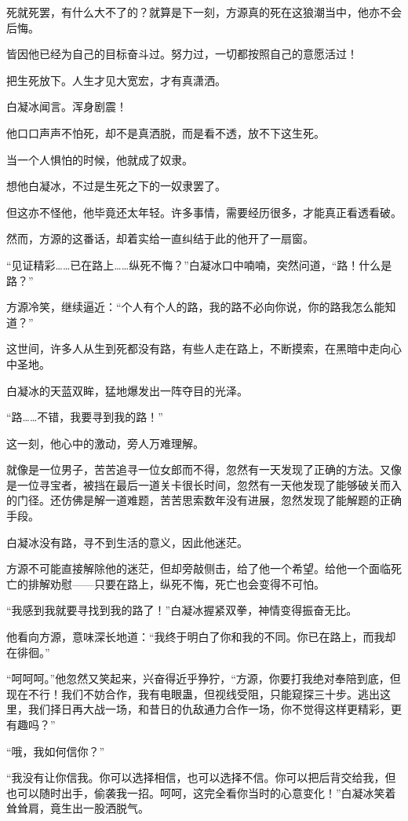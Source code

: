 \begin{this_body}
死就死罢，有什么大不了的？就算是下一刻，方源真的死在这狼潮当中，他亦不会后悔。

皆因他已经为自己的目标奋斗过。努力过，一切都按照自己的意愿活过！

把生死放下。人生才见大宽宏，才有真潇洒。

白凝冰闻言。浑身剧震！

他口口声声不怕死，却不是真洒脱，而是看不透，放不下这生死。

当一个人惧怕的时候，他就成了奴隶。

想他白凝冰，不过是生死之下的一奴隶罢了。

但这亦不怪他，他毕竟还太年轻。许多事情，需要经历很多，才能真正看透看破。

然而，方源的这番话，却着实给一直纠结于此的他开了一扇窗。

“见证精彩……已在路上……纵死不悔？”白凝冰口中喃喃，突然问道，“路！什么是路？”

方源冷笑，继续逼近：“个人有个人的路，我的路不必向你说，你的路我怎么能知道？”

这世间，许多人从生到死都没有路，有些人走在路上，不断摸索，在黑暗中走向心中圣地。

白凝冰的天蓝双眸，猛地爆发出一阵夺目的光泽。

“路……不错，我要寻到我的路！”

这一刻，他心中的激动，旁人万难理解。

就像是一位男子，苦苦追寻一位女郎而不得，忽然有一天发现了正确的方法。又像是一位寻宝者，被挡在最后一道关卡很长时间，忽然有一天他发现了能够破关而入的门径。还仿佛是解一道难题，苦苦思索数年没有进展，忽然发现了能解题的正确手段。

白凝冰没有路，寻不到生活的意义，因此他迷茫。

方源不可能直接解除他的迷茫，但却旁敲侧击，给了他一个希望。给他一个面临死亡的排解劝慰——只要在路上，纵死不悔，死亡也会变得不可怕。

“我感到我就要寻找到我的路了！”白凝冰握紧双拳，神情变得振奋无比。

他看向方源，意味深长地道：“我终于明白了你和我的不同。你已在路上，而我却在徘徊。”

“呵呵呵。”他忽然又笑起来，兴奋得近乎狰狞，“方源，你要打我绝对奉陪到底，但现在不行！我们不妨合作，我有电眼蛊，但视线受阻，只能窥探三十步。逃出这里，我们择日再大战一场，和昔日的仇敌通力合作一场，你不觉得这样更精彩，更有趣吗？”

“哦，我如何信你？”

“我没有让你信我。你可以选择相信，也可以选择不信。你可以把后背交给我，但也可以随时出手，偷袭我一招。呵呵，这完全看你当时的心意变化！”白凝冰笑着耸耸肩，竟生出一股洒脱气。


\end{this_body}
